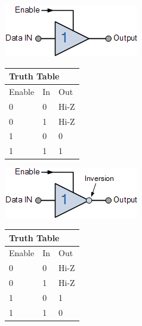 \begin{minipage}{0.45\textwidth}
	\includegraphics[width=\textwidth]{figures/move/motor50}
\end{minipage}
\hfill
\begin{minipage}{0.45\textwidth}
	\centering
	\begin{tabular}{|l|l|l|}
	\hline
	\multicolumn{3}{|l|}{Truth Table} \\ \hline
	Enable      & In      & Out       \\ \hline
	0           & 0       & Hi-Z      \\ \hline
	0           & 1       & Hi-Z      \\ \hline
	1           & 0       & 0         \\ \hline
	1           & 1       & 1         \\ \hline
	\end{tabular}
\end{minipage}

\vspace{10mm}

\begin{minipage}{0.45\textwidth}
	\includegraphics[width=\textwidth]{figures/move/motor51}
\end{minipage}
\hfill
\begin{minipage}{0.45\textwidth}
	\centering
	\begin{tabular}{|l|l|l|}
	\hline
	\multicolumn{3}{|l|}{Truth Table} \\ \hline
	Enable      & In      & Out       \\ \hline
	0           & 0       & Hi-Z      \\ \hline
	0           & 1       & Hi-Z      \\ \hline
	1           & 0       & 1         \\ \hline
	1           & 1       & 0         \\ \hline
	\end{tabular}
\end{minipage}

